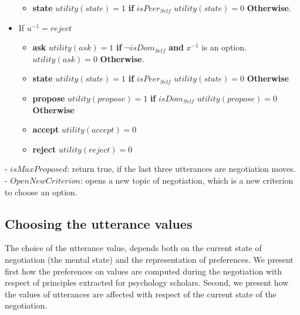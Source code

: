 \documentclass{llncs}
\begin{document}
\begin{itemize}
\begin{itemize}
	\item \textbf{ state}
		\subitem $utility(state) = 1$ \textbf{ if } $isPeer_{Self}$
		\subitem $utility(state) = 0$ \textbf{Otherwise}.
	\\		
	\end{itemize}
	\item If $u^{-1}=reject$
	\begin{itemize}
		\item \textbf{ask}	
			\subitem $utility(ask) =1 $ \textbf{ if } $\neg isDom_{Self}$ \textbf{ and } $x^{-1}$ is an option.
			\subitem $utility(ask) = 0$ \textbf{Otherwise}.
		\item \textbf{state}
			\subitem $utility(state) = 1$ \textbf{ if } $isPeer_{Self}$
			\subitem $utility(state) = 0$ \textbf{ Otherwise}
		\item \textbf{propose}
			\subitem $utility(propose) = 1$ \textbf{ if } $isDom_{Self}$
			\subitem $utility(propose) = 0$ \textbf{Otherwise}
		\item \textbf{accept}
			\subitem $utility(accept) = 0$
		\item \textbf{reject}	
			\subitem $utility(reject) =0 $	
	\end{itemize}
	
\end{itemize}

- $isMaxProposed$: return true, if the last three utterances are negotiation moves.
- $OpenNewCriterion$: opens a new topic of negotiation, which is a new criterion to choose an option.


\subsection{Choosing the utterance values}
The choice of the utterance value, depends both on the current state of negotiation (the mental state) and the representation of preferences. We present first how the preferences on values are computed during the negotiation with respect of principles extracted for psychology scholars. 
Second, we present how the values of utterances are affected with respect of the current state of the negotiation.
\end{document}
